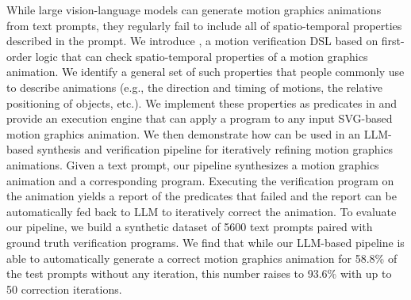 While large vision-language models can generate motion graphics animations
from text prompts, they regularly fail to include all of
spatio-temporal properties described in the prompt. 
%
We introduce \dslname{}, a motion verification DSL based on
first-order logic that can check spatio-temporal properties of a
motion graphics animation.
%
We identify a general set of such properties that people commonly use
to describe animations (e.g., the direction and timing of motions,
the relative positioning of objects, etc.).
%
We implement these properties as predicates in \dslname{} and provide an execution
engine that can apply a \dslname{} program to any input
SVG-based motion graphics animation.
%
We then demonstrate how \dslname{} can be used in an LLM-based
synthesis and verification pipeline for iteratively refining motion graphics animations.
%
Given a text prompt, our pipeline synthesizes a motion graphics animation and a corresponding \dslname{} program. 
%
Executing the verification program on the animation yields a report of the predicates that failed
and the report can be automatically fed back to LLM to iteratively correct the animation.
%
To evaluate our pipeline, we build a synthetic dataset of
5600 text prompts paired with 
ground truth \dslname{} verification programs.
%
We find that while our LLM-based pipeline is able to automatically generate a
correct motion graphics animation for 58.8\% of the test prompts
without any iteration, this number raises to 93.6\% with up to 50
correction iterations.





